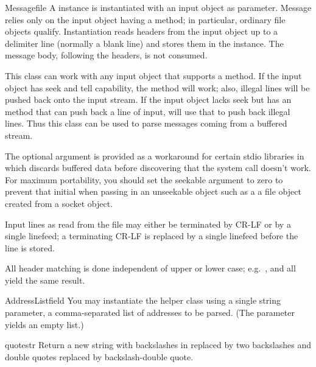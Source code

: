 \begin{classdesc}{Message}{file}
A  instance is instantiated with an input object as
parameter.  Message relies only on the input object having a
 method; in particular, ordinary file objects
qualify.  Instantiation reads headers from the input object up to a
delimiter line (normally a blank line) and stores them in the
instance.  The message body, following the headers, is not consumed.

This class can work with any input object that supports a
 method.  If the input object has seek and tell
capability, the  method will work; also, illegal
lines will be pushed back onto the input stream.  If the input object
lacks seek but has an  method that can push back a
line of input,  will use that to push back illegal
lines.  Thus this class can be used to parse messages coming from a
buffered stream.

The optional  argument is provided as a workaround for
certain stdio libraries in which  discards buffered
data before discovering that the  system call
doesn't work.  For maximum portability, you should set the seekable
argument to zero to prevent that initial  when passing
in an unseekable object such as a a file object created from a socket
object.

Input lines as read from the file may either be terminated by CR-LF or
by a single linefeed; a terminating CR-LF is replaced by a single
linefeed before the line is stored.

All header matching is done independent of upper or lower case;
e.g.\ ,  and
 all yield the same result.
\end{classdesc}

\begin{classdesc}{AddressList}{field}
You may instantiate the  helper class using a single
string parameter, a comma-separated list of  addresses to be
parsed.  (The parameter  yields an empty list.)
\end{classdesc}

\begin{funcdesc}{quote}{str}
Return a new string with backslashes in  replaced by two
backslashes and double quotes replaced by backslash-double quote.
\end{funcdesc}


